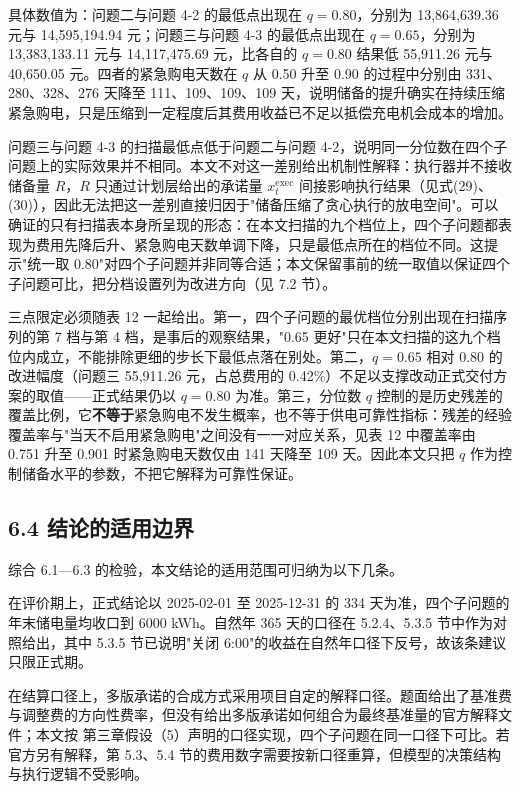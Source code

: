 \documentclass[12pt,a4paper]{ctexart}
\begin{document}
具体数值为：问题二与问题 4-2 的最低点出现在 $q=0.80$，分别为 13,864,639.36 元与 14,595,194.94 元；问题三与问题 4-3 的最低点出现在 $q=0.65$，分别为 13,383,133.11 元与 14,117,475.69 元，比各自的 $q=0.80$ 结果低 55,911.26 元与 40,650.05 元。四者的紧急购电天数在 $q$ 从 0.50 升至 0.90 的过程中分别由 331、280、328、276 天降至 111、109、109、109 天，说明储备的提升确实在持续压缩紧急购电，只是压缩到一定程度后其费用收益已不足以抵偿充电机会成本的增加。

问题三与问题 4-3 的扫描最低点低于问题二与问题 4-2，说明同一分位数在四个子问题上的实际效果并不相同。本文不对这一差别给出机制性解释：执行器并不接收储备量 $R$，$R$ 只通过计划层给出的承诺量 $x_t^{\mathrm{exec}}$ 间接影响执行结果（见式(29)、(30)），因此无法把这一差别直接归因于"储备压缩了贪心执行的放电空间"。可以确证的只有扫描表本身所呈现的形态：在本文扫描的九个档位上，四个子问题都表现为费用先降后升、紧急购电天数单调下降，只是最低点所在的档位不同。这提示"统一取 0.80"对四个子问题并非同等合适；本文保留事前的统一取值以保证四个子问题可比，把分档设置列为改进方向（见 7.2 节）。

三点限定必须随表 12 一起给出。第一，四个子问题的最优档位分别出现在扫描序列的第 7 档与第 4 档，是事后的观察结果，"0.65 更好"只在本文扫描的这九个档位内成立，不能排除更细的步长下最低点落在别处。第二，$q=0.65$ 相对 $0.80$ 的改进幅度（问题三 55,911.26 元，占总费用的 0.42\%）不足以支撑改动正式交付方案的取值——正式结果仍以 $q=0.80$ 为准。第三，分位数 $q$ 控制的是历史残差的覆盖比例，它\textbf{不等于}紧急购电不发生概率，也不等于供电可靠性指标：残差的经验覆盖率与"当天不启用紧急购电"之间没有一一对应关系，见表 12 中覆盖率由 0.751 升至 0.901 时紧急购电天数仅由 141 天降至 109 天。因此本文只把 $q$ 作为控制储备水平的参数，不把它解释为可靠性保证。

\subsection*{6.4 结论的适用边界}

综合 6.1—6.3 的检验，本文结论的适用范围可归纳为以下几条。

在评价期上，正式结论以 2025-02-01 至 2025-12-31 的 334 天为准，四个子问题的年末储电量均收口到 6000 kWh。自然年 365 天的口径在 5.2.4、5.3.5 节中作为对照给出，其中 5.3.5 节已说明"关闭 6:00"的收益在自然年口径下反号，故该条建议只限正式期。

在结算口径上，多版承诺的合成方式采用项目自定的解释口径。题面给出了基准费与调整费的方向性费率，但没有给出多版承诺如何组合为最终基准量的官方解释文件；本文按 第三章假设（5）声明的口径实现，四个子问题在同一口径下可比。若官方另有解释，第 5.3、5.4 节的费用数字需要按新口径重算，但模型的决策结构与执行逻辑不受影响。
\end{document}
